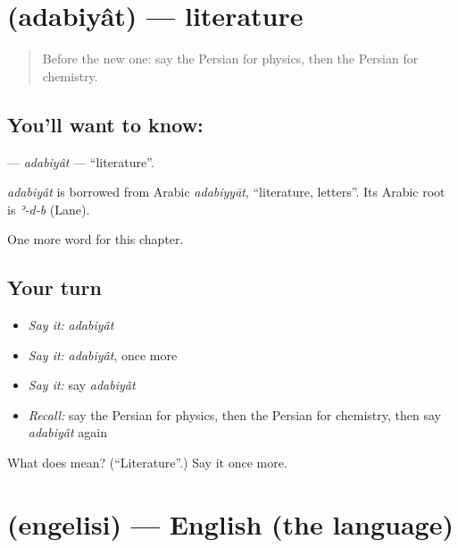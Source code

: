 \section[\texorpdfstring{\fa{ادبیات} (adabiyât)}{ادبیات (adabiyât)}]{ (adabiyât) — literature}

\label{lesson:FA-C285-adabiyat}



\begin{quote}
Before the new one: say the Persian for physics, then the Persian for chemistry.
\end{quote}

\subsection*{You'll want to know: }
\textbf{} — \emph{adabiyât} — \textquotedblleft{}literature\textquotedblright{}.

\begin{cousinweb}
\emph{adabiyât} is borrowed from Arabic \emph{adabiyyāt}, \textquotedblleft{}literature, letters\textquotedblright{}. Its Arabic root is \emph{ʾ-d-b} (Lane).
\end{cousinweb}

\begin{grammarlens}[title={What you've built}]
One more word for this chapter.
\end{grammarlens}

\subsection*{Your turn}
\begin{itemize}
\raggedright
  \item \emph{Say it:} \emph{adabiyât}
  \item \emph{Say it:} \emph{adabiyât}, once more
  \item \emph{Say it:} say \emph{adabiyât}
  \item \emph{Recall:} say the Persian for physics, then the Persian for chemistry, then say \emph{adabiyât} again
\end{itemize}

\begin{tcolorbox}[breakable,colback=teal!4,colframe=teal!35!black,title={Before you move on}]
What does  mean? (\textquotedblleft{}Literature\textquotedblright{}.) Say it once more.
\end{tcolorbox}
\section[\texorpdfstring{\fa{انگلیسی} (engelisi)}{انگلیسی (engelisi)}]{ (engelisi) — English (the language)}

